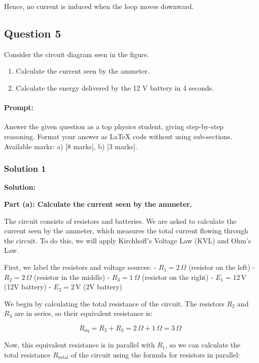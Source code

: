 \documentclass{article}
\begin{document}
Hence, no current is induced when the loop moves downward.


\subsection{Question 5}
Consider the circuit diagram seen in the figure.
\begin{enumerate}
    \item Calculate the current seen by the ammeter.
    \item Calculate the energy delivered by the 12 V battery in 4 seconds.
\end{enumerate}


\paragraph{Prompt: \\} 
Answer the given question as a top physics student, giving step-by-step reasoning. Format your answer as LaTeX code without using sub-sections. Available marks: a) [8 marks], b) [3 marks].

\subsubsection{Solution 1}
\textbf{Solution:}

\textbf{Part (a): Calculate the current seen by the ammeter.}

The circuit consists of resistors and batteries. We are asked to calculate the current seen by the ammeter, which measures the total current flowing through the circuit. To do this, we will apply Kirchhoff’s Voltage Law (KVL) and Ohm’s Law.

First, we label the resistors and voltage sources:
- \( R_1 = 2 \, \Omega \) (resistor on the left)
- \( R_2 = 2 \, \Omega \) (resistor in the middle)
- \( R_3 = 1 \, \Omega \) (resistor on the right)
- \( E_1 = 12 \, \text{V} \) (12V battery)
- \( E_2 = 2 \, \text{V} \) (2V battery)

We begin by calculating the total resistance of the circuit. The resistors \( R_2 \) and \( R_3 \) are in series, so their equivalent resistance is:

\[
R_{\text{eq}} = R_2 + R_3 = 2 \, \Omega + 1 \, \Omega = 3 \, \Omega
\]

Now, this equivalent resistance is in parallel with \( R_1 \), so we can calculate the total resistance \( R_{\text{total}} \) of the circuit using the formula for resistors in parallel:
\end{document}
